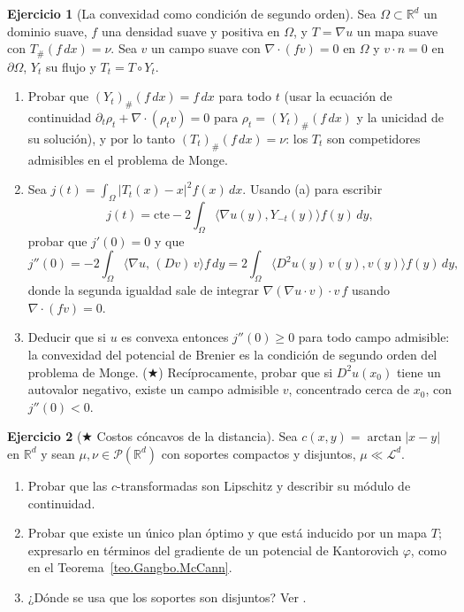 \documentclass[12pt, a4paper]{amsbook}
\newcommand{\R}{{\mathbb R}}
\newcommand{\LL}{{\mathcal L}}
\theoremstyle{remark}
\theoremstyle{definition}
\newtheorem{ejercicio}{Ejercicio}[chapter]
\numberwithin{section}{chapter}
\numberwithin{subsection}{section}
\numberwithin{equation}{section}
\numberwithin{figure}{chapter}
\begin{document}
\begin{ejercicio}[La convexidad como condición de segundo orden]\label{ejer.Brenier.segunda.variacion}
Sea $\Omega\subset\R^d$ un dominio suave, $f$ una densidad suave y positiva
en $\Omega$, y $T=\nabla u$ un mapa suave con $T_\#(f\,dx)=\nu$. Sea $v$ un
campo suave con $\nabla\cdot(fv)=0$ en $\Omega$ y $v\cdot n=0$ en
$\partial\Omega$, $Y_t$ su flujo y $T_t=T\circ Y_t$.
\begin{enumerate}[label=(\alph*)]
\item Probar que $(Y_t)_\#(f\,dx)=f\,dx$ para todo $t$ (usar la ecuación de
continuidad $\partial_t\rho_t+\nabla\cdot(\rho_tv)=0$ para $\rho_t=(Y_t)_\#(f\,dx)$
y la unicidad de su solución), y por lo tanto $(T_t)_\#(f\,dx)=\nu$: los
$T_t$ son competidores admisibles en el problema de Monge.
\item Sea $j(t)=\int_\Omega|T_t(x)-x|^2f(x)\,dx$. Usando (a) para escribir
\[
j(t)=\text{cte}-2\int_\Omega\langle\nabla u(y),Y_{-t}(y)\rangle f(y)\,dy,
\]
probar que $j'(0)=0$ y que
\[
j''(0)=-2\int_\Omega\bigl\langle\nabla u,\,(Dv)\,v\bigr\rangle f\,dy
=2\int_\Omega\bigl\langle D^2u(y)\,v(y),v(y)\bigr\rangle f(y)\,dy ,
\]
donde la segunda igualdad sale de integrar $\nabla(\nabla u\cdot v)\cdot v\,f$
usando $\nabla\cdot(fv)=0$.
\item Deducir que si $u$ es convexa entonces $j''(0)\ge0$ para todo campo
admisible: la convexidad del potencial de Brenier es la condición de
segundo orden del problema de Monge. ($\bigstar$) Recíprocamente, probar que
si $D^2u(x_0)$ tiene un autovalor negativo, existe un campo admisible $v$,
concentrado cerca de $x_0$, con $j''(0)<0$.
\end{enumerate}
\end{ejercicio}

\begin{ejercicio}[$\bigstar$ Costos cóncavos de la distancia]\label{ejer.Brenier.arctan}
Sea $c(x,y)=\arctan|x-y|$ en $\R^d$ y sean $\mu,\nu\in\mathcal P(\R^d)$ con
soportes compactos y disjuntos, $\mu\ll\LL^d$.
\begin{enumerate}[label=(\alph*)]
\item Probar que las $c$-transformadas son Lipschitz y describir su módulo
de continuidad.
\item Probar que existe un único plan óptimo y que está inducido por un
mapa $T$; expresarlo en términos del gradiente de un potencial de
Kantorovich $\varphi$, como en el Teorema~\ref{teo.Gangbo.McCann}.
\item ¿Dónde se usa que los soportes son disjuntos? Ver
\cite[Sec.~3.3.2]{Santambrogio}.
\end{enumerate}
\end{ejercicio}
\end{document}
